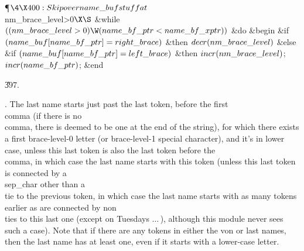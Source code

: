 \Y\P$\4\X400:Skip over \\{name\_buf} stuff at $\\{nm\_brace\_level}>0$\X\S$\6
\&{while} $((\\{nm\_brace\_level}>0)\W(\\{name\_bf\_ptr}<\\{name\_bf\_xptr}))$ %
\1\&{do}\6
\&{begin} \&{if} $(\\{name\_buf}[\\{name\_bf\_ptr}]=\\{right\_brace})$ \1%
\&{then}\5
$\\{decr}(\\{nm\_brace\_level})$\6
\4\&{else} \&{if} $(\\{name\_buf}[\\{name\_bf\_ptr}]=\\{left\_brace})$ \1%
\&{then}\5
$\\{incr}(\\{nm\_brace\_level})$;\2\2\6
$\\{incr}(\\{name\_bf\_ptr})$;\6
\&{end}\2\par
\U397.\fi

.
The last name starts just past the last token, before the first
\\{comma} (if there is no \\{comma}, there is deemed to be one at the end
of the string), for which there exists a first brace-level-0 letter
(or brace-level-1 special character), and it's in lower case, unless
this last token is also the last token before the \\{comma}, in which
case the last name starts with this token (unless this last token is
connected by a \\{sep\_char} other than a \\{tie} to the previous token, in
which case the last name starts with as many tokens earlier as are
connected by non\\{tie}s to this last one (except on Tuesdays
$\ldots\,$), although this module never sees such a case).  Note that
if there are any tokens in either the von or last names, then the last
name has at least one, even if it starts with a lower-case letter.

